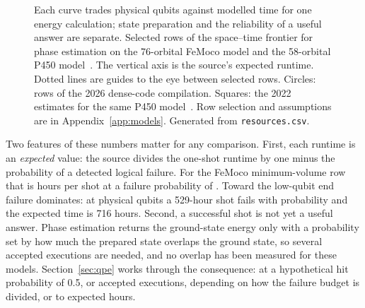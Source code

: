 \documentclass[10pt,a4paper]{article}
\begin{document}
\begin{figure}[htbp]
\centering
{}
\caption[FeMoco and P450: selected rows of the 2026 quantum cost frontier]{Each curve trades physical qubits against modelled time for one energy calculation; state preparation and the reliability of a useful answer are separate. Selected rows of the space--time frontier for phase estimation on the 76-orbital FeMoco model and the 58-orbital P450 model~\cite{low2026dense}. The vertical axis is the source's expected runtime. Dotted lines are guides to the eye between selected rows. Circles: rows of the 2026 dense-code compilation. Squares: the 2022 estimates for the same P450 model~\cite{goings2022}. Row selection and assumptions are in Appendix~\ref{app:models}. Generated from \texttt{resources.csv}.}
\label{fig:dc76}
\end{figure}

Two features of these numbers matter for any comparison. First, each runtime is an \emph{expected} value: the source divides the one-shot runtime by one minus the probability of a detected logical failure. For the FeMoco minimum-volume row that is \femoShot{} hours per shot at a failure probability of \femoPfail. Toward the low-qubit end failure dominates: at \femoSevLowQ{} physical qubits a 529-hour shot fails with probability \femoLowPfail{} and the expected time is 716 hours. Second, a successful shot is not yet a useful answer. Phase estimation returns the ground-state energy only with a probability set by how much the prepared state overlaps the ground state, so several accepted executions are needed, and no overlap has been measured for these models. Section~\ref{sec:qpe} works through the consequence: at a hypothetical hit probability of 0.5, \repAttempts{} or \repAttemptsSplit{} accepted executions, depending on how the failure budget is divided, or \repHours{} to \repHoursSplit{} expected hours.
\end{document}
